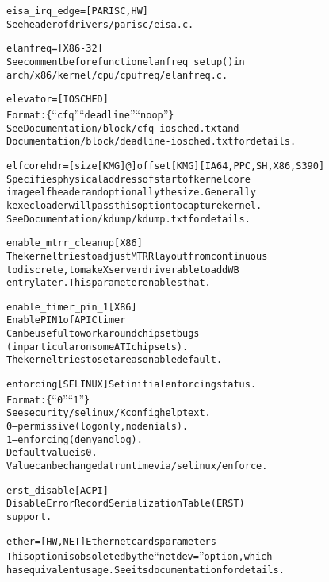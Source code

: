 \documentclass[a4paper,8pt,english]{sphinxmanual}
\begin{document}
\begin{alltt}
        eisa\_irq\_edge=  {[}PARISC,HW{]}
                        See header of drivers/parisc/eisa.c.

        elanfreq=       {[}X86-32{]}
                        See comment before function elanfreq\_setup() in
                        arch/x86/kernel/cpu/cpufreq/elanfreq.c.

        elevator=       {[}IOSCHED{]}
                        Format: \{``cfq'' \textbar{} ``deadline'' \textbar{} ``noop''\}
                        See Documentation/block/cfq-iosched.txt and
                        Documentation/block/deadline-iosched.txt for details.

        elfcorehdr={[}size{[}KMG{]}@{]}offset{[}KMG{]} {[}IA64,PPC,SH,X86,S390{]}
                        Specifies physical address of start of kernel core
                        image elf header and optionally the size. Generally
                        kexec loader will pass this option to capture kernel.
                        See Documentation/kdump/kdump.txt for details.

        enable\_mtrr\_cleanup {[}X86{]}
                        The kernel tries to adjust MTRR layout from continuous
                        to discrete, to make X server driver able to add WB
                        entry later. This parameter enables that.

        enable\_timer\_pin\_1 {[}X86{]}
                        Enable PIN 1 of APIC timer
                        Can be useful to work around chipset bugs
                        (in particular on some ATI chipsets).
                        The kernel tries to set a reasonable default.

        enforcing       {[}SELINUX{]} Set initial enforcing status.
                        Format: \{``0'' \textbar{} ``1''\}
                        See security/selinux/Kconfig help text.
                        0 -- permissive (log only, no denials).
                        1 -- enforcing (deny and log).
                        Default value is 0.
                        Value can be changed at runtime via /selinux/enforce.

        erst\_disable    {[}ACPI{]}
                        Disable Error Record Serialization Table (ERST)
                        support.

        ether=          {[}HW,NET{]} Ethernet cards parameters
                        This option is obsoleted by the ``netdev='' option, which
                        has equivalent usage. See its documentation for details.


\end{alltt}
\end{document}

